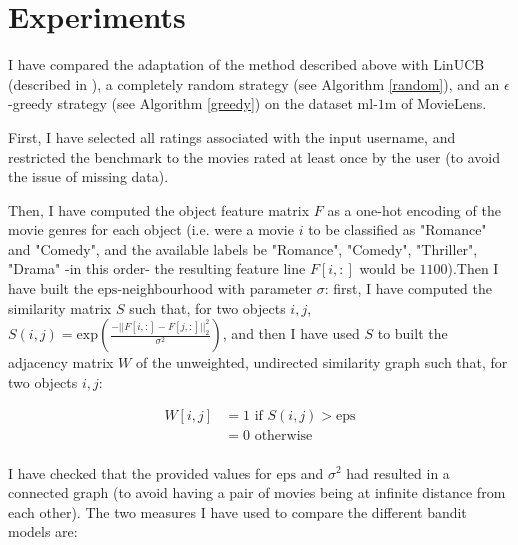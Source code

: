 \documentclass{article}
\begin{document}
\section{Experiments}

I have compared the adaptation of the method described above with LinUCB (described in \cite{chu2011contextual}), a completely random strategy (see Algorithm \ref{random}), and an $\epsilon$-greedy strategy (see Algorithm \ref{greedy}) on the dataset $\text{ml-1m}$ of MovieLens. 

First, I have selected all ratings associated with the input username, and restricted the benchmark to the movies rated at least once by the user (to avoid the issue of missing data).

Then, I have computed the object feature matrix $F$ as a one-hot encoding of the movie genres for each object (i.e. were a movie $i$ to be classified as "Romance" and "Comedy", and the available labels be "Romance", "Comedy", "Thriller", "Drama" -in this order- the resulting feature line $F[i, :]$ would be $1100$).Then I have built the $\text{eps}$-neighbourhood with parameter $\sigma$: first, I have computed the similarity matrix $S$ such that, for two objects $i,j$, $S(i,j) = \text{exp}(\frac{-||F[i,:]-F[j,:]||^{2}_{2}}{\sigma^{2}})$, and then I have used $S$ to built the adjacency matrix $W$ of the unweighted, undirected similarity graph such that, for two objects $i, j$:

\begin{equation}
\begin{split}
W[i, j] & = 1 \mbox{ if $S(i,j) > \text{eps}$}\\
& = 0 \mbox{ otherwise}\\ 
\end{split}
\end{equation}

I have checked that the provided values for $\text{eps}$ and $\sigma^{2}$ had resulted in a connected graph (to avoid having a pair of movies being at infinite distance from each other). The two measures I have used to compare the different bandit models are:
\end{document}

